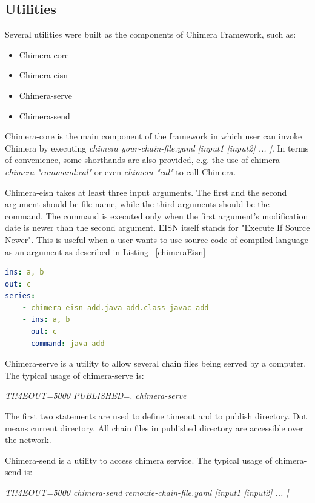 \documentclass[conference]{IEEEtran}
\begin{document}
\subsection{Utilities}

Several utilities were built as the components of Chimera Framework, such as:

\begin{itemize}
    \item Chimera-core
    \item Chimera-eisn
    \item Chimera-serve
    \item Chimera-send
\end{itemize}

Chimera-core is the main component of the framework in which user can invoke Chimera by
executing {\it chimera your-chain-file.yaml [input1 [input2] ... ]}. In terms of convenience,
some shorthands are also provided, e.g. the use of chimera 
{\it chimera "command:cal"} or even {\it chimera "cal"} to call Chimera.

Chimera-eisn takes at least three input arguments. The first and the second argument should
be file name, while the third arguments should be the command. The command is 
executed only when the first argument's modification date is newer than the second 
argument. EISN itself stands for "Execute If Source Newer". This is useful when a user
wants to use source code of compiled language as an argument as described in Listing ~\ref{chimeraEisn}

\begin{lstlisting}[caption=Chimera-eisn usage example, label=chimeraEisn, language=yaml, basicstyle=\small, breaklines=true]
ins: a, b
out: c
series:
    - chimera-eisn add.java add.class javac add
    - ins: a, b
      out: c
      command: java add
\end{lstlisting}

Chimera-serve is a utility to allow several chain files being served by a computer.
The typical usage of chimera-serve is:

{\it TIMEOUT=5000 PUBLISHED=. chimera-serve}

The first two statements are used to define timeout and to publish directory. Dot means
current directory. All chain files in published directory are accessible over the network.

Chimera-send is a utility to access chimera service.
The typical usage of chimera-send is: 

{\it TIMEOUT=5000 chimera-send remoute-chain-file.yaml [input1 [input2] ... ]}
\end{document}
